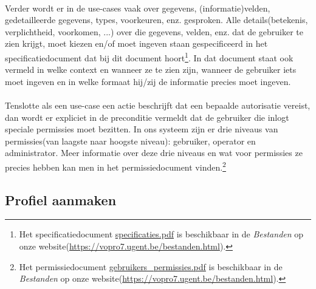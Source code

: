 \documentclass[11pt,twoside,a4paper]{article}
\begin{document}
\paragraph{}Verder wordt er in de use-cases vaak over gegevens, (informatie)velden, gedetailleerde gegevens, types, voorkeuren, enz. gesproken. Alle details(betekenis, verplichtheid, voorkomen, ...) over die gegevens, velden, enz. dat de gebruiker te zien krijgt, moet kiezen en/of moet ingeven staan gespecificeerd in het specificatiedocument dat bij dit document hoort\footnote{Het specificatiedocument \href{./specificaties.pdf}{specificaties.pdf} is beschikbaar in de \textit{Bestanden} op onze website(\url{https://vopro7.ugent.be/bestanden.html}).}. In dat document staat ook vermeld in welke context en wanneer ze te zien zijn, wanneer de gebruiker iets moet ingeven en in welke formaat hij/zij de informatie precies moet ingeven.

\paragraph{}Tenslotte als een use-case een actie beschrijft dat een bepaalde autorisatie vereist, dan wordt er expliciet in de preconditie vermeldt dat de gebruiker die inlogt speciale permissies moet bezitten. In ons systeem zijn er drie niveaus van permissies(van laagste naar hoogste niveau): gebruiker, operator en administrator. Meer informatie over deze drie niveaus en wat voor permissies ze precies hebben kan men in het permissiedocument vinden.\footnote{Het permissiedocument \href{./gebruikers\_permissies.pdf}{gebruikers\_permissies.pdf} is beschikbaar in de \textit{Bestanden} op onze website(\url{https://vopro7.ugent.be/bestanden.html}).}





\newpage

	\tableofcontents
	
	
\newpage




	
	\subsection{Profiel aanmaken}\label{new_user}
	
\end{document}
